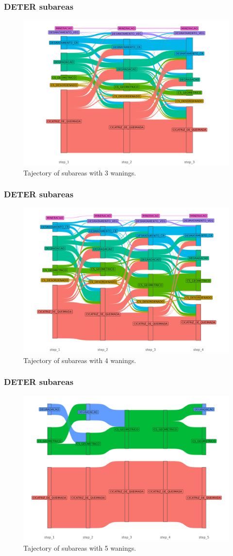 \documentclass[aspectratio=169]{beamer}
\begin{document}
\begin{frame}
    \frametitle{DETER subareas}
    \begin{figure}[h] 
        \includegraphics[width=0.65\linewidth]
        {./figures/plot_deter_subarea_trajectory_3.png}
        \caption{Tajectory of subareas with 3 wanings.}
        \label{fig:deter_subarea_trajectory_3}
    \end{figure}
\end{frame}

\begin{frame}
    \frametitle{DETER subareas}
    \begin{figure}[h] 
        \includegraphics[width=0.65\linewidth]
        {./figures/plot_deter_subarea_trajectory_4.png}
        \caption{Tajectory of subareas with 4 wanings.}
        \label{fig:deter_subarea_trajectory_4}
    \end{figure}
\end{frame}

\begin{frame}
    \frametitle{DETER subareas}
    \begin{figure}[h] 
        \includegraphics[width=0.65\linewidth]
        {./figures/plot_deter_subarea_trajectory_5.png}
        \caption{Tajectory of subareas with 5 wanings.}
        \label{fig:deter_subarea_trajectory_5}
    \end{figure}
\end{frame}
\end{document}
